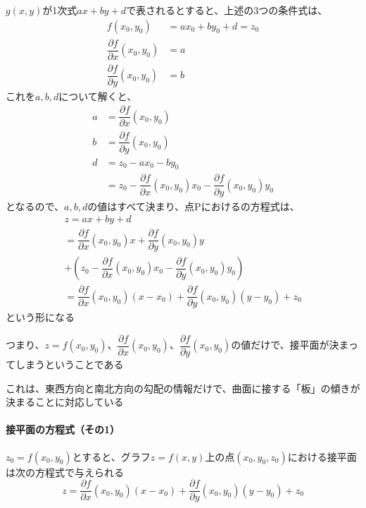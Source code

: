 \documentclass[../book_jiriki_calc]{subfiles}
\begin{document}
$g(x,y)$が1次式$ax+by+d$で表されるとすると、上述の3つの条件式は、
\begin{align*}
  f(x_0,y_0) &= ax_0+by_0+d = z_0 \\
  \dfrac{\partial f}{\partial x}(x_0,y_0) & = a \\
  \dfrac{\partial f}{\partial y}(x_0,y_0) & = b
\end{align*}
これを$a,b,d$について解くと、
\begin{align*}
  a & = \dfrac{\partial f}{\partial x}(x_0,y_0) \\
  b & = \dfrac{\partial f}{\partial y}(x_0,y_0) \\
  d & = z_0 - a x_0 - b y_0 \\
    & = z_0 - \dfrac{\partial f}{\partial x}(x_0,y_0)x_0 - \dfrac{\partial f}{\partial y}(x_0,y_0)y_0
\end{align*}
となるので、$a,b,d$の値はすべて決まり、点Pにおけるの方程式は、
\begin{multline*}
  z = ax + by + d \\
    = \dfrac{\partial f}{\partial x}(x_0,y_0)x + \dfrac{\partial f}{\partial y}(x_0,y_0)y \\ + \left(z_0 - \dfrac{\partial f}{\partial x}(x_0,y_0)x_0 - \dfrac{\partial f}{\partial y}(x_0,y_0)y_0\right) \\
    = \dfrac{\partial f}{\partial x}(x_0,y_0)(x-x_0) + \dfrac{\partial f}{\partial y}(x_0,y_0)(y-y_0) + z_0
\end{multline*}
という形になる

\br

つまり、$z=f(x_0,y_0)$、$\dfrac{\partial f}{\partial x}(x_0,y_0)$、$\dfrac{\partial f}{\partial y}(x_0,y_0)$の値だけで、接平面が決まってしまうということである

これは、東西方向と南北方向の勾配の情報だけで、曲面に接する「板」の傾きが決まることに対応している

\sectionline

\paragraph{接平面の方程式（その1）}

$z_0=f(x_0,y_0)$とすると、グラフ$z=f(x,y)$上の点$(x_0,y_0,z_0)$における接平面は次の方程式で与えられる
\begin{equation*}
  z = \dfrac{\partial f}{\partial x}(x_0,y_0)(x-x_0) + \dfrac{\partial f}{\partial y}(x_0,y_0)(y-y_0) + z_0
\end{equation*}
\end{document}
